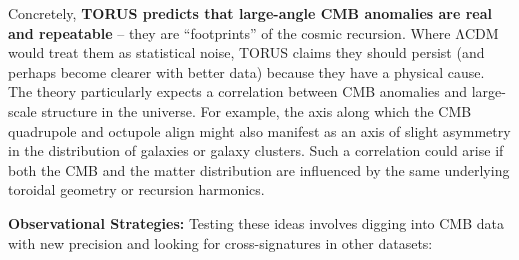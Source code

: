 Concretely, \textbf{TORUS predicts that large-angle CMB anomalies are
real and repeatable} -- they are ``footprints'' of the cosmic recursion.
Where ΛCDM would treat them as statistical noise, TORUS claims they
should persist (and perhaps become clearer with better data) because
they have a physical cause​. The theory particularly expects a
correlation between CMB anomalies and large-scale structure in the
universe​. For example, the axis along which the CMB quadrupole and
octupole align might also manifest as an axis of slight asymmetry in the
distribution of galaxies or galaxy clusters. Such a correlation could
arise if both the CMB and the matter distribution are influenced by the
same underlying toroidal geometry or recursion harmonics.

\textbf{Observational Strategies:} Testing these ideas involves digging
into CMB data with new precision and looking for cross-signatures in
other datasets:

